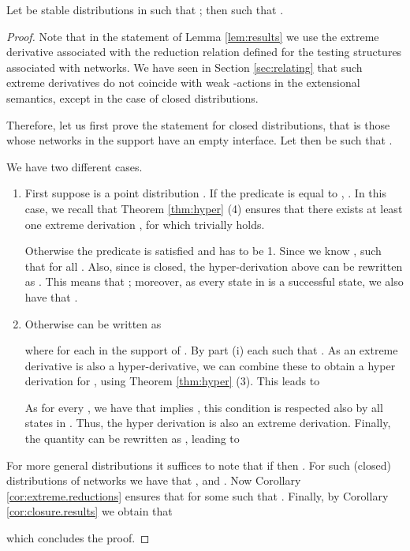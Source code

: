 \documentclass{LMCS}
\begin{document}
\begin{lem}
 \label{lem:results}
  Let  be stable distributions in   such that ; 
  then  such that . 
\end{lem}
\begin{proof}
	Note that in the statement of Lemma \ref{lem:results} 
	we use the extreme derivative associated with the reduction relation 
   defined for the testing structures associated with networks. 
  We have seen in Section \ref{sec:relating} that such extreme derivatives 
  do not coincide with weak -actions in the extensional semantics, 
  except in the case of closed distributions.

	Therefore, let us first prove the statement for closed distributions, 
	that is those whose networks in the support have an empty interface. 
	Let then  be such that .
	
  We have two different cases.
  \begin{enumerate}[label=(\roman*)]
  \item First suppose  is a point distribution . If the predicate  
    is equal to , . 
    In this case, we recall that Theorem \ref{thm:hyper} (4) ensures that 
    there exists at least one extreme derivation , for which 
     trivially holds. 
    
    Otherwise the predicate  is satisfied and  has to be 1. Since 
     we know , such that for all . Also, since  is closed, the hyper-derivation 
    above can be rewritten as . This means that ; 
    moreover, as every state in  is a successful state, we also have that 
    .

\item
Otherwise  can be written as 

where  for each  in the support of . 
By part (i) each  such that .
As an extreme derivative is also a hyper-derivative, we can combine these to obtain a hyper 
derivation for , using Theorem \ref{thm:hyper} (3). This leads to 

As for every ,  we have that 
 implies , this condition is respected 
also by all states in . Thus, the hyper derivation 
 is also an extreme derivation. 
Finally, the quantity  
can be rewritten as , leading to 

 
  \end{enumerate}
  
\noindent For more general distributions  it suffices to note 
that if  then . For such (closed) distributions 
of networks we have that , 
and . Now Corollary 
\ref{cor:extreme.reductions} ensures that  
for some  such that . 
Finally, by Corollary \ref{cor:closure.results} we obtain that 

which concludes the proof.
\end{proof}
\end{document}
